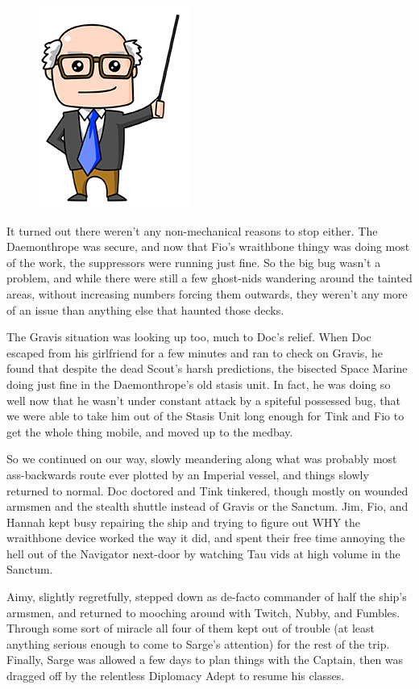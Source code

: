 \begin{figure}
	\begin{center}
		\includegraphics[width=\figwidth]{pics/15/73.png}
	\end{center}
\end{figure}
It turned out there weren't any non-mechanical reasons to stop either. 
The Daemonthrope was secure, and now that Fio's wraithbone thingy was doing most of the work, the suppressors were running just fine. 
So the big bug wasn't a problem, and while there were still a few ghost-nids wandering around the tainted areas, without increasing numbers forcing them outwards, they weren't any more of an issue than anything else that haunted those decks.

The Gravis situation was looking up too, much to Doc's relief. 
When Doc escaped from his girlfriend for a few minutes and ran to check on Gravis, he found that despite the dead Scout's harsh predictions, the bisected Space Marine doing just fine in the Daemonthrope's old stasis unit. 
In fact, he was doing so well now that he wasn't under constant attack by a spiteful possessed bug, that we were able to take him out of the Stasis Unit long enough for Tink and Fio to get the whole thing mobile, and moved up to the medbay.

So we continued on our way, slowly meandering along what was probably most ass-backwards route ever plotted by an Imperial vessel, and things slowly returned to normal. 
Doc doctored and Tink tinkered, though mostly on wounded armsmen and the stealth shuttle instead of Gravis or the Sanctum. 
Jim, Fio, and Hannah kept busy repairing the ship and trying to figure out WHY the wraithbone device worked the way it did, and spent their free time annoying the hell out of the Navigator next-door by watching Tau vids at high volume in the Sanctum. 


Aimy, slightly regretfully, stepped down as de-facto commander of half the ship's armsmen, and returned to mooching around with Twitch, Nubby, and Fumbles. 
Through some sort of miracle all four of them kept out of trouble (at least anything serious enough to come to Sarge's attention) for the rest of the trip. 
Finally, Sarge was allowed a few days to plan things with the Captain, then was dragged off by the relentless Diplomacy Adept to resume his classes.

